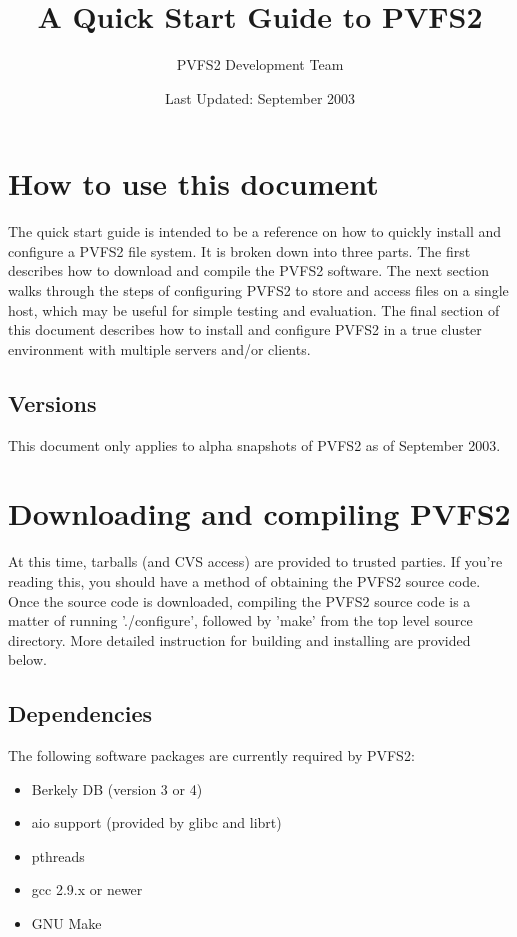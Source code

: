 \documentclass[11pt, letterpaper]{article}
\title{A Quick Start Guide to PVFS2}
\author{ PVFS2 Development Team }
\date{ Last Updated: September 2003 }
\begin{document}
\maketitle

\tableofcontents

\newpage

\thispagestyle{empty}

\section{How to use this document}
\label{sec:howto}

The quick start guide is intended to be a reference on how to quickly
install and configure a PVFS2 file system.  It is broken down into
three parts.  The first describes how to download and compile the
PVFS2 software.  The next section walks through the steps of
configuring PVFS2 to store and access files on a single host, which
may be useful for simple testing and evaluation.  The final section of
this document describes how to install and configure PVFS2 in a true
cluster environment with multiple servers and/or clients.

\subsection{Versions}

This document only applies to alpha snapshots of PVFS2 as of September
2003.

\section{Downloading and compiling PVFS2}

At this time, tarballs (and CVS access) are provided to trusted
parties.  If you're reading this, you should have a method of
obtaining the PVFS2 source code.  Once the source code is downloaded,
compiling the PVFS2 source code is a matter of running './configure',
followed by 'make' from the top level source directory.  More detailed
instruction for building and installing are provided below.

\subsection{Dependencies}

The following software packages are currently required by PVFS2:
\begin{itemize}
\item Berkely DB (version 3 or 4)
\item aio support (provided by glibc and librt)
\item pthreads
\item gcc 2.9.x or newer
\item GNU Make
\end{itemize}
\end{document}
